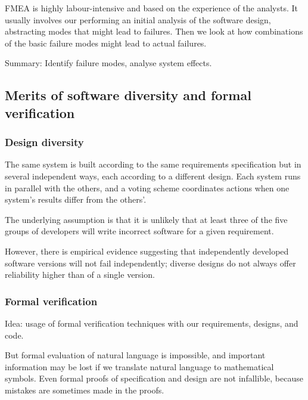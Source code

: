 FMEA is highly labour-intensive and based on the experience of the
analysts. It usually involves our performing an initial analysis of the
software design, abstracting modes that might lead to failures. Then we
look at how combinations of the basic failure modes might lead to actual
failures. \newline

Summary: Identify failure modes, analyse system effects.

\subsection{Merits of software diversity and formal verification}

\subsubsection{Design diversity}

The same system is built according to the same requirements
specification but in several independent ways, each according to a
different design. Each system runs in parallel with the others, and a
voting scheme coordinates actions when one system’s results differ from
the others’. \newline

The underlying assumption is that it is unlikely that at least three of
the five groups of developers will write incorrect software for a given
requirement. \newline

However, there is empirical evidence suggesting that independently
developed software versions will not fail independently; diverse designs
do not always offer reliability higher than of a single version.

\subsubsection{Formal verification}

Idea: usage of formal verification techniques with our requirements,
designs, and code. \newline 

But formal evaluation of natural language is impossible, and important
information may be lost if we translate natural language to mathematical
symbols. Even formal proofs of specification and design are not
infallible, because mistakes are sometimes made in the proofs.
